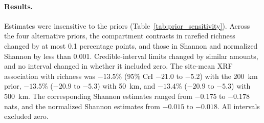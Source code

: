 \documentclass[11pt]{article}
\begin{document}
\paragraph{Results.}
Estimates were insensitive to the priors (Table~\ref{tab:prior_sensitivity}). Across the four alternative priors, the compartment contrasts in rarefied richness changed by at most 0.1 percentage points, and those in Shannon and normalized Shannon by less than 0.001. Credible-interval limits changed by similar amounts, and no interval changed in whether it included zero. The site-mean XRF association with richness was $-13.5\%$ (95\% CrI $-21.0$ to $-5.2$) with the 200~km prior, $-13.5\%$ ($-20.9$ to $-5.3$) with 50~km, and $-13.4\%$ ($-20.9$ to $-5.3$) with 500~km. The corresponding Shannon estimates ranged from $-0.175$ to $-0.178$ nats, and the normalized Shannon estimates from $-0.015$ to $-0.018$. All intervals excluded zero.
\end{document}
